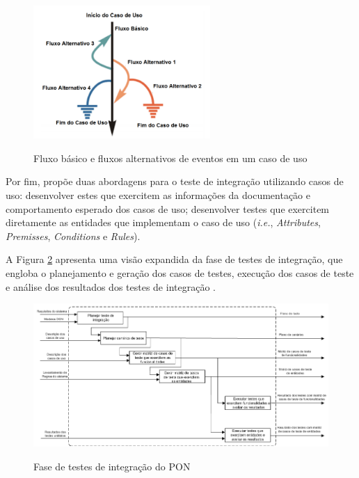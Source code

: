 \begin{figure}[!htb]
  \centering
  \caption{Fluxo básico e fluxos alternativos de eventos em um caso de uso}
  \includegraphics[width=0.6\textwidth]{../figures/use_cases.png}
  \smallskip
  \label{fig:use_cases}
\end{figure}

Por fim,  propõe duas abordagens para o teste de
integração utilizando casos de uso: desenvolver estes que exercitem as
informações da documentação e comportamento esperado dos casos de uso;
desenvolver testes que exercitem diretamente as entidades que implementam o caso
de uso (\textit{i.e.}, \textit{Attributes}, \textit{Premisses},
\textit{Conditions} e \textit{Rules}).

A Figura \ref{fig:int_pon} apresenta uma visão expandida da fase de testes de
integração, que engloba o planejamento e geração dos casos de testes, execução
dos casos de teste e análise dos resultados dos testes de integração
\cite{msc_Kossoski_2015}.

\begin{figure}[!htb]
  \centering
  \caption{Fase de testes de integração do PON}
  \includegraphics[width=\textwidth]{../figures/int_pon.png}
  \smallskip
  \label{fig:int_pon}
\end{figure}

